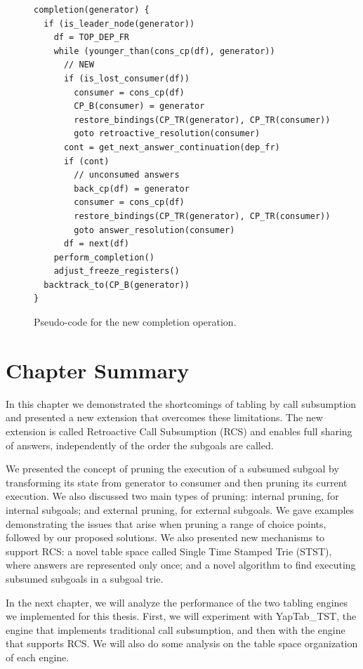 \begin{figure}[ht]
\begin{Verbatim}
completion(generator) {
  if (is_leader_node(generator))
    df = TOP_DEP_FR
    while (younger_than(cons_cp(df), generator))
      // NEW
      if (is_lost_consumer(df))
        consumer = cons_cp(df)
        CP_B(consumer) = generator
        restore_bindings(CP_TR(generator), CP_TR(consumer))
        goto retroactive_resolution(consumer)
      cont = get_next_answer_continuation(dep_fr)
      if (cont)
        // unconsumed answers
        back_cp(df) = generator
        consumer = cons_cp(df)
        restore_bindings(CP_TR(generator), CP_TR(consumer))
        goto answer_resolution(consumer)
      df = next(df)
    perform_completion()
    adjust_freeze_registers()
  backtrack_to(CP_B(generator))
}
\end{Verbatim}
\caption{Pseudo-code for the new completion operation.}
\label{fig:completion_operation_retro}
\end{figure}

\section{Chapter Summary}

In this chapter we demonstrated the shortcomings of tabling by call subsumption and presented a
new extension that overcomes these limitations. The new extension is called Retroactive Call Subsumption (RCS)
and enables full sharing of answers, independently of the order the subgoals are called.

We presented the concept of pruning the execution of a subsumed subgoal by transforming its state from
generator to consumer and then pruning its current execution. We also discussed two main types of pruning:
internal pruning, for internal subgoals; and external pruning, for external subgoals.
We gave examples demonstrating the issues that arise when pruning a range of choice points, followed
by our proposed solutions.
We also presented new mechanisms to support RCS: a novel table space called Single Time Stamped Trie (STST),
where answers are represented only once; and a novel algorithm to find executing subsumed subgoals in a subgoal
trie.

In the next chapter, we will analyze the performance of the two tabling engines we implemented for this thesis.
First, we will experiment with YapTab\_TST, the engine that implements traditional call subsumption, and then
with the engine that supports RCS. We will also do some analysis on the table space organization of each engine.